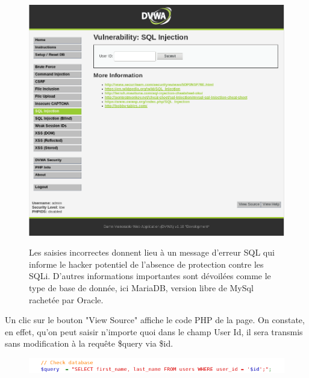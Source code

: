 \begin{figure}[!h]
	\begin{center}
		\label{}
		\includegraphics[scale=\scaledvwa]{images/sql/sqli1.png}
		\caption{Les saisies incorrectes donnent lieu à un message d'erreur SQL qui informe le hacker potentiel de l'absence de protection contre les SQLi. D'autres informations importantes sont dévoilées comme le type de base de donnée, ici MariaDB, version libre de MySql rachetée par Oracle.}
	\end{center}
\end{figure}

Un clic sur le bouton "View Source" affiche le code PHP de la page. On constate, en effet, qu'on peut saisir n'importe quoi dans le champ User Id, il sera transmis sans modification à la requête \$query via \$id.   

\begin{figure}[!h]
	\begin{center}
		\label{}
		\includegraphics[scale=0.8]{images/sql/code_low.png}
	\end{center}
\end{figure}



